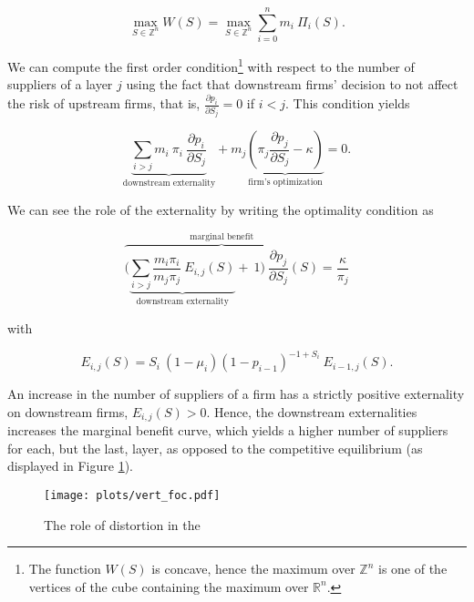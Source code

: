 \documentclass[american, abstract=on]{scrartcl}
\renewcommand{\Re}{\mathbb{R}}
\begin{document}
\begin{equation}
  \max_{S \in \mathbb{Z}^n} W(S) = \max_{S \in \mathbb{Z}^n} \sum^n_{i = 0} m_i \ \Pi_i(S).
\end{equation}

We can compute the first order condition\footnote{The function $W(S)$ is concave, hence the maximum over $\mathbb{Z}^n$ is one of the vertices of the cube containing the maximum over $\Re^n$.} with respect to the number of suppliers of a layer $j$ using the fact that downstream firms' decision to not affect the risk of upstream firms, that is, $\frac{\partial p_i}{\partial S_j} = 0$ if $i < j$. This condition yields

\begin{equation}
  \underbrace{\sum_{i > j} m_i \ \pi_i \ \frac{\partial p_i}{\partial S_j}}_{\text{downstream externality}} + m_j  \underbrace{\left( \pi_j \frac{\partial p_j}{\partial S_j} - \kappa\right)}_{\text{firm's optimization}} = 0.
\end{equation}

We can see the role of the externality by writing the optimality condition as 

\begin{equation} \label{eq:distortion}
  \overbrace{\Bigg(\underbrace{\sum_{i> j} \frac{m_i\pi_i}{m_j\pi_j} \ E_{i, j}(S)}_{\text{downstream externality}} + \ 1 \Bigg)\ \frac{\partial p_j}{\partial S_j}(S)}^{\text{marginal benefit}} = \frac{\kappa}{\pi_j}
\end{equation}

with

\begin{equation}
  E_{i, j}(S) = S_i \ (1 - \mu_i) (1 - p_{i-1})^{-1 + S_i}\ E_{i - 1, j}(S).
\end{equation}

An increase in the number of suppliers of a firm has a strictly positive externality on downstream firms, $E_{i, j}(S) > 0$. Hence, the downstream externalities increases the marginal benefit curve, which yields a higher number of suppliers for each, but the last, layer, as opposed to the competitive equilibrium (as displayed in Figure \ref{fig:vert_foc}).


\begin{figure}[H]
  \centering
  \texttt{[image: plots/vert\_foc.pdf]} 
  \caption{The role of distortion in the }
  \label{fig:vert_foc}
\end{figure}

\newpage
\nocite{*}
\printbibliography
\end{document}
